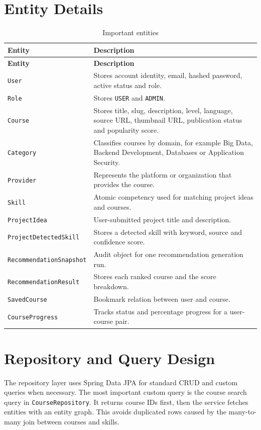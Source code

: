 \documentclass[12pt,a4paper]{report}
\begin{document}
\section{Entity Details}
\begin{longtable}{p{}p{}}
\caption{Important entities}\\
\toprule
\textbf{Entity} & \textbf{Description}\\
\midrule
\endfirsthead
\toprule
\textbf{Entity} & \textbf{Description}\\
\midrule
\endhead
\texttt{User} & Stores account identity, email, hashed password, active status and role.\\
\texttt{Role} & Stores \texttt{USER} and \texttt{ADMIN}.\\
\texttt{Course} & Stores title, slug, description, level, language, source URL, thumbnail URL, publication status and popularity score.\\
\texttt{Category} & Classifies courses by domain, for example Big Data, Backend Development, Databases or Application Security.\\
\texttt{Provider} & Represents the platform or organization that provides the course.\\
\texttt{Skill} & Atomic competency used for matching project ideas and courses.\\
\texttt{ProjectIdea} & User-submitted project title and description.\\
\texttt{ProjectDetectedSkill} & Stores a detected skill with keyword, source and confidence score.\\
\texttt{RecommendationSnapshot} & Audit object for one recommendation generation run.\\
\texttt{RecommendationResult} & Stores each ranked course and the score breakdown.\\
\texttt{SavedCourse} & Bookmark relation between user and course.\\
\texttt{CourseProgress} & Tracks status and percentage progress for a user-course pair.\\
\bottomrule
\end{longtable}

\section{Repository and Query Design}
The repository layer uses Spring Data JPA for standard CRUD and custom queries when necessary. The most important custom query is the course search query in \texttt{CourseRepository}. It returns course IDs first, then the service fetches entities with an entity graph. This avoids duplicated rows caused by the many-to-many join between courses and skills.
\end{document}
